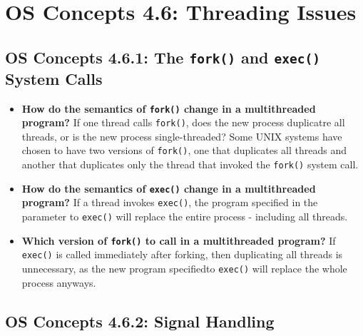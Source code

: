 \documentclass[12pt]{article}
\begin{document}
\section*{OS Concepts 4.6: Threading Issues}

\subsection*{OS Concepts 4.6.1: The \texttt{fork()} and \texttt{exec()} System Calls}

\begin{itemize}
    \item \textbf{How do the semantics of \texttt{fork()} change in a multithreaded program?} If one thread calls \texttt{fork()}, does the new process duplicatre all threads, or is the new process single-threaded? Some UNIX systems have chosen to have two versions of \texttt{fork()}, one that duplicates all threads and another that duplicates only the thread that invoked the \texttt{fork()} system call.
    \item \textbf{How do the semantics of \texttt{exec()} change in a multithreaded program?} If a thread invokes \texttt{exec()}, the program specified in the parameter to \texttt{exec()} will replace the entire process - including all threads.
    \item \textbf{Which version of \texttt{fork()} to call in a multithreaded program?} If \texttt{exec()} is called immediately after forking, then duplicating all threads is unnecessary, as the new program specifiedto \texttt{exec()} will replace the whole process anyways.
\end{itemize}

\subsection*{OS Concepts 4.6.2: Signal Handling}
\end{document}
